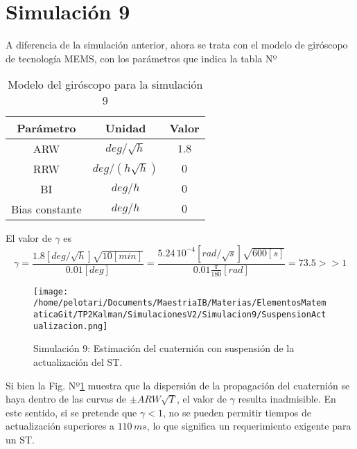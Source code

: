 \documentclass[a4paper,11pt,twoside]{IT-CNEA}
\begin{document}
\section{Simulación 9}
A diferencia de la simulación anterior, ahora se trata con el modelo de giróscopo de tecnología MEMS, con los parámetros que indica la tabla Nº
\begin{table}[h!]
\centering
\caption{Modelo del giróscopo para la simulación 9}
\label{tabla:modeloGyroRLGSimulacion9}
\begin{tabular}{|c|c|c|}
\hline
Parámetro & Unidad& Valor\\ \hline
ARW&$deg/\sqrt{h}$&$1.8$ \\ \hline
RRW&$deg/\left(h\sqrt{h}\right)$&$0$ \\ \hline
BI&$deg/h$&$0$ \\ \hline
Bias constante&$deg/h$&$0$ \\ \hline
\end{tabular}
\end{table}
El valor de $\gamma$ es
\begin{equation}
\gamma=\frac{1.8\left[deg/\sqrt{h}\right]\sqrt{10\left[min\right]}}{0.01\left[deg\right]}=\frac{5.24\,10^{-4}\left[rad/\sqrt{s}\right]\sqrt{600\left[s\right]}}{0.01\frac{\pi}{180}\left[rad\right]}=	73.5>>1
\end{equation}
\begin{figure}[h!]
\centering
\texttt{[image: /home/pelotari/Documents/MaestriaIB/Materias/ElementosMatematicaGit/TP2Kalman/SimulacionesV2/Simulacion9/SuspensionActualizacion.png]}
\caption{Simulación 9: Estimación del cuaternión con suspensión de la actualización del ST.}
\label{fig:Simulacion9/SuspensionActualizacion}
\end{figure}
Si bien la Fig. Nº\ref{fig:Simulacion9/SuspensionActualizacion} muestra que la dispersión de la propagación del cuaternión se haya dentro de las curvas de $\pm ARW\sqrt{T}$, el valor de $\gamma$ resulta inadmisible. En este sentido, si se pretende que $\gamma <1$, no se pueden permitir tiempos de actualización superiores a $110\,ms$, lo que significa un requerimiento exigente para un ST.
\clearpage
\newpage
\end{document}
